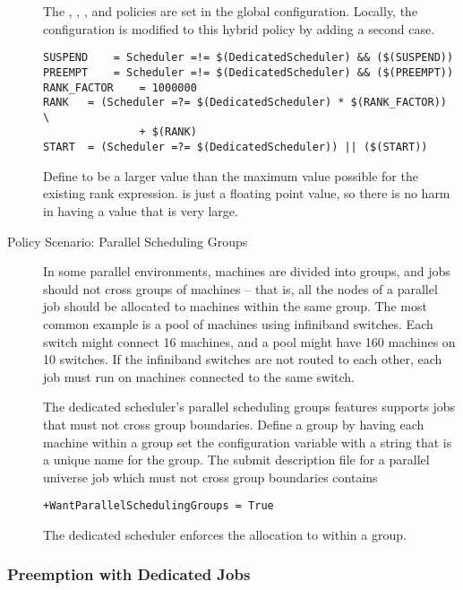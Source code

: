 \begin{description}
The , , , and
 policies are set in the global configuration.
Locally, the configuration is modified to this hybrid policy
by adding a second case.

\begin{verbatim}
SUSPEND    = Scheduler =!= $(DedicatedScheduler) && ($(SUSPEND))
PREEMPT    = Scheduler =!= $(DedicatedScheduler) && ($(PREEMPT))
RANK_FACTOR    = 1000000
RANK   = (Scheduler =?= $(DedicatedScheduler) * $(RANK_FACTOR)) \
               + $(RANK)
START  = (Scheduler =?= $(DedicatedScheduler)) || ($(START))
\end{verbatim}

Define  to be a
larger value than the maximum value possible for the existing rank expression.
\Macro{RANK} is just a floating point value, so there is no harm in
having a value that is very large. 


\item[Policy Scenario: Parallel Scheduling Groups]

In some parallel environments, machines are divided into groups, and
jobs should not cross groups of machines -- that is, all the nodes of a parallel
job should be allocated to machines within the same group.
The most common example is a pool of machines using infiniband switches.
Each switch
might connect 16 machines, and a pool might have 160 machines on 10 switches.
If the infiniband switches are not routed to each other, each job must run 
on machines connected to the same switch.  

The dedicated scheduler's 
parallel scheduling groups features supports jobs that must not 
cross group boundaries.
Define a group by having each machine within a group
set the configuration variable 
 with a string that is a unique name for
the group.
The submit description file for a parallel universe job which
must not cross group boundaries contains 
\begin{verbatim}
+WantParallelSchedulingGroups = True
\end{verbatim}

The dedicated scheduler enforces the allocation to within a group.
\end{description}

\subsubsection{\label{sec:Configure-Dedicated-Preemption}
Preemption with Dedicated Jobs}

